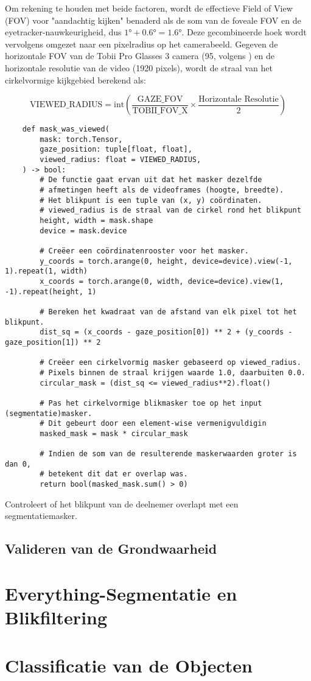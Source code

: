 Om rekening te houden met beide factoren, wordt de effectieve Field of View (FOV) voor 
"aandachtig kijken" benaderd als de som van de foveale FOV en de eyetracker-nauwkeurigheid, dus \(1° + 0.6° = 1.6° \).
Deze gecombineerde hoek wordt vervolgens omgezet naar een pixelradius op het camerabeeld. 
Gegeven de horizontale FOV van de Tobii Pro Glasses 3 camera (95\textdegree, volgens \textcite{tobii_pro_glasses_3}) en de horizontale resolutie van de video (1920 pixels),
wordt de straal van het cirkelvormige kijkgebied berekend als:

\[
\text{VIEWED\_RADIUS} = \text{int}\left( \frac{\text{GAZE\_FOV}}{\text{TOBII\_FOV\_X}} \times \frac{\text{Horizontale Resolutie}}{2} \right)
\]

\begin{listing}
  \begin{verbatim}
    def mask_was_viewed(
        mask: torch.Tensor,
        gaze_position: tuple[float, float],
        viewed_radius: float = VIEWED_RADIUS,
    ) -> bool:
        # De functie gaat ervan uit dat het masker dezelfde
        # afmetingen heeft als de videoframes (hoogte, breedte).
        # Het blikpunt is een tuple van (x, y) coördinaten.
        # viewed_radius is de straal van de cirkel rond het blikpunt
        height, width = mask.shape
        device = mask.device

        # Creëer een coördinatenrooster voor het masker.
        y_coords = torch.arange(0, height, device=device).view(-1, 1).repeat(1, width)
        x_coords = torch.arange(0, width, device=device).view(1, -1).repeat(height, 1)

        # Bereken het kwadraat van de afstand van elk pixel tot het blikpunt.
        dist_sq = (x_coords - gaze_position[0]) ** 2 + (y_coords - gaze_position[1]) ** 2

        # Creëer een cirkelvormig masker gebaseerd op viewed_radius.
        # Pixels binnen de straal krijgen waarde 1.0, daarbuiten 0.0.
        circular_mask = (dist_sq <= viewed_radius**2).float()
        
        # Pas het cirkelvormige blikmasker toe op het input (segmentatie)masker.
        # Dit gebeurt door een element-wise vermenigvuldigin
        masked_mask = mask * circular_mask

        # Indien de som van de resulterende maskerwaarden groter is dan 0,
        # betekent dit dat er overlap was.
        return bool(masked_mask.sum() > 0)

  \end{verbatim}
  \caption[\texttt{mask\_was\_viewed} functie]{
    Controleert of het blikpunt van de deelnemer overlapt met een segmentatiemasker.
  }
\end{listing}



\subsection{Valideren van de Grondwaarheid}

\section{Everything-Segmentatie en Blikfiltering}

\section{Classificatie van de Objecten}


